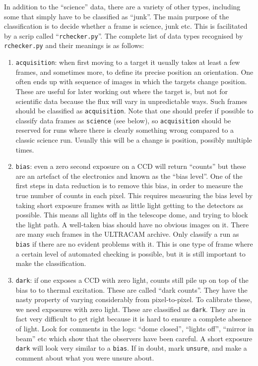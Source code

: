 \documentclass[10pt,a4paper]{article}
\newcommand{\dt}[1]{\texttt{#1}}
\begin{document}
In addition to the ``science'' data, there are a variety of other types,
including some that simply have to be classified as ``junk''. The main purpose
of the classification is to decide whether a frame is science, junk etc. This
is facilitated by a scrip called ``\dt{rchecker.py}''. The complete list of
data types recognised by \dt{rchecker.py} and their meanings is as follows:
\begin{enumerate}

\item \dt{acquisition}: when first moving to a target it usually takes at
  least a few frames, and sometimes more, to define its precise position an
  orientation. One often ends up with sequence of images in which the targets
  change position. These are useful for later working out where the target is,
  but not for scientific data because the flux will vary in unpredictable
  ways. Such frames should be classified as \dt{acquisition}. Note that one
  should prefer if possible to classify data frames as \dt{science} (see
  below), so \dt{acquisition} should be reserved for runs where there is
  clearly something wrong compared to a classic science run. Usually this will
  be a change is position, possibly multiple times.

\item \dt{bias}: even a zero second exposure on a CCD will return ``counts''
  but these are an artefact of the electronics and known as the ``bias
  level''. One of the first steps in data reduction is to remove this bias, in
  order to measure the true number of counts in each pixel. This requires
  measuring the bias level by taking short exposure frames with as little
  light getting to the detectors as possible. This means all lights off in the
  telescope dome, and trying to block the light path. A well-taken bias should
  have no obvious images on it. There are many such frames in the ULTRACAM
  archive. Only classify a run as \dt{bias} if there are no evident problems
  with it. This is one type of frame where a certain level of automated
  checking is possible, but it is still important to make the classification.

\item \dt{dark}: if one exposes a CCD with zero light, counts still pile up on
  top of the bias to to thermal excitation. These are called ``dark
  counts''. They have the nasty property of varying considerably from 
  pixel-to-pixel. To calibrate these, we need exposures with zero light. These
  are classified as \dt{dark}. They are in fact very difficult to get right
  because it is hard to ensure a complete absence of light. Look for comments
  in the logs: ``dome closed'', ``lights off'', ``mirror in beam'' etc which
  show that the observers have been careful. A short exposure \dt{dark} will
  look very similar to a \dt{bias}. If in doubt, mark \dt{unsure}, and make a
  comment about what you were unsure about.


\end{enumerate}
\end{document}
